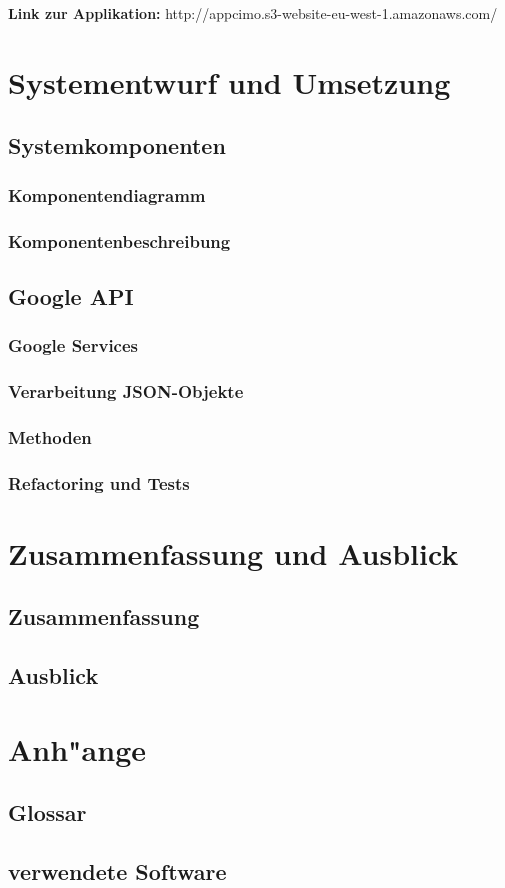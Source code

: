 \documentclass[a4paper, 11pt]{scrreprt}
\begin{document}
\textbf{Link zur Applikation: } http://appcimo.s3-website-eu-west-1.amazonaws.com/ 

\chapter{Systementwurf und Umsetzung}

\section{Systemkomponenten}

\subsection{Komponentendiagramm}

\subsection{Komponentenbeschreibung}

\section{Google API}

\subsection{Google Services}

\subsection{Verarbeitung JSON-Objekte}

\subsection{Methoden}

\subsection{Refactoring und Tests}

\chapter{Zusammenfassung und Ausblick}

\section{Zusammenfassung}

\section{Ausblick}

\chapter{Anh"ange}

\section{Glossar}

\section{verwendete Software}
\end{document}
